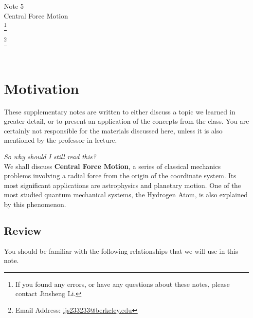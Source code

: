 \documentclass[11pt]{article}
\newcommand\blfootnote[1]{
    \begingroup
    \renewcommand\thefootnote{}\footnote{#1}
    \addtocounter{footnote}{-1}
    \endgroup
}
\theoremstyle{gangnamstyle}{\newtheorem{definition}{Definition}[]}
\theoremstyle{gangnamstyle}{\newtheorem{example}{Example}[]}
\theoremstyle{gangnamstyle}{\newtheorem{problem}{Problem}[]}
\theoremstyle{gangnamstyle}{\newtheorem{warning}{Warning}[]}
\begin{document}
\normalfont
\pagestyle{pages}


\begin{center}
\vspace{3in}
{\Large Note 5} \\[0.05in]
Central Force Motion \\ 
\blfootnote{If you found any errors, or have any questions about these notes, please contact Jinsheng Li.} \blfootnote{Email Address: \href{mailto:ljs233233@berkeley.edu}{ljs233233@berkeley.edu}} \\ [-0.5in]
\end{center}

\section*{Motivation}

These supplementary notes are written to either discuss a topic we learned in greater detail, or to present an application of the concepts from the class. You are certainly not responsible for the materials discussed here, unless it is also mentioned by the professor in lecture. 

\textit{So why should I still read this?} \\
We shall discuss \textbf{Central Force Motion}, a series of classical mechanics problems involving a radial force from the origin of the coordinate system. Its most significant applications are astrophysics and planetary motion. One of the most studied quantum mechanical systems, the Hydrogen Atom, is also explained by this phenomenon. 

\subsection*{Review}

You should be familiar with the following relationships that we will use in this note. 
\end{document}
